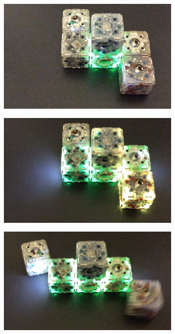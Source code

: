 \begin{figure}[h]  
	\centering
	\begin{subfigure}[b]{0.32\linewidth}
		\includegraphics[width=0.95\linewidth]{figures/ActualLine_1.png}
		\subcaption{} 
	\end{subfigure}
	\begin{subfigure}[b]{0.32\linewidth}
		\includegraphics[width=0.95\linewidth]{figures/ActualLine_2.png}
		\subcaption{} 
	\end{subfigure}
	\begin{subfigure}[b]{0.32\linewidth}
		\includegraphics[width=0.95\linewidth]{figures/ActualLine_3.png}
		\subcaption{} 
	\end{subfigure}


\end{figure}
